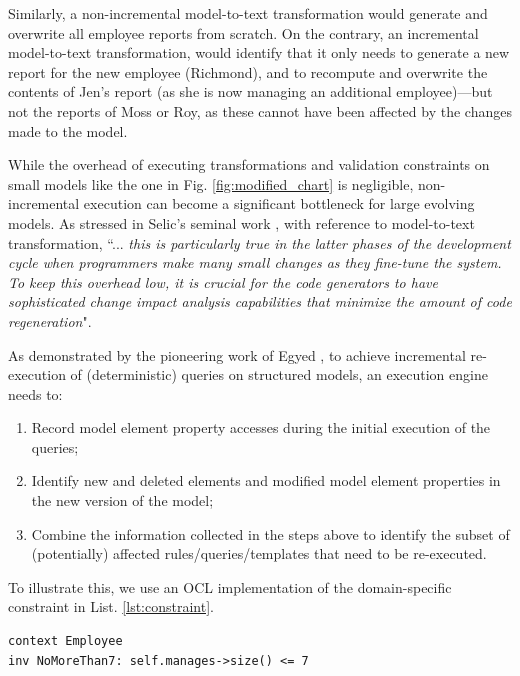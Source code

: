 \documentclass{llncs}
\begin{document}
Similarly, a non-incremental model-to-text transformation would generate and overwrite all employee reports from scratch. On the contrary, an incremental model-to-text transformation, would identify that it only needs to generate a new report for the new employee (Richmond), and to recompute and overwrite the contents of Jen's report (as she is now managing an additional employee)---but not the reports of Moss or Roy, as these cannot have been affected by the changes made to the model.

While the overhead of executing transformations and validation constraints on small models like the one in Fig. \ref{fig:modified_chart} is negligible, non-incremental execution can become a significant bottleneck for large evolving models. As stressed in Selic's seminal work \cite{selic2003pragmatics}, with reference to model-to-text transformation, ``... \emph{this is particularly true in the latter phases of the development cycle when programmers make many small changes as they fine-tune the system. To keep this overhead low, it is crucial for the code generators to have sophisticated change impact analysis capabilities that minimize the amount of code regeneration}".

As demonstrated by the pioneering work of Egyed \cite{egyed2011automatically}, to achieve incremental re-execution of (deterministic) queries on structured models, an execution engine needs to:

\begin{enumerate}
\item Record model element property accesses during the initial execution of the queries;
\item Identify new and deleted elements and modified model element properties in the new version of the model;
\item Combine the information collected in the steps above to identify the subset of (potentially) affected rules/queries/templates that need to be re-executed.
\end{enumerate}

To illustrate this, we use an OCL implementation of the domain-specific constraint in List. \ref{lst:constraint}.

\begin{lstlisting}[style=ocl,caption={OCL constraint requiring that no employee directly manages more than 7 other employees.},label=lst:constraint]
context Employee
inv NoMoreThan7: self.manages->size() <= 7
\end{lstlisting}
\end{document}
